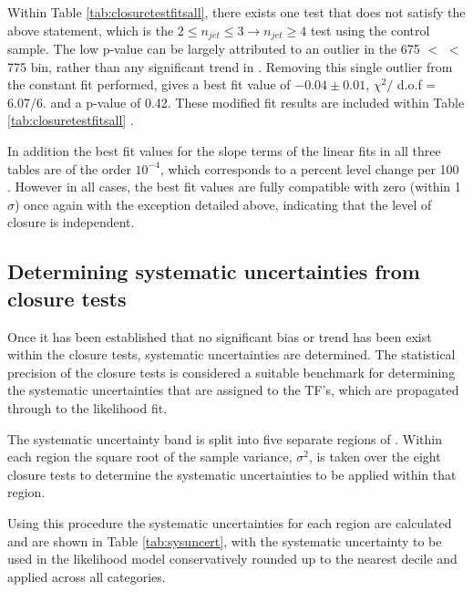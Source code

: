 Within Table \ref{tab:closuretestfitsall}, there exists one test that does not satisfy the above statement, which is the $2 \leq n_{jet} \leq 3 \rightarrow n_{jet} \geq 4$ test using the \mupjets control sample. The low p-value can be largely attributed to an outlier in the 675 $<$ \theht $<$ 775 \GeV bin, rather than any significant trend in \theht. Removing this single outlier from the constant fit performed, gives a best fit value of $-0.04 \pm 0.01$, $\chi^{2} /$ d.o.f = 6.07/6. and a p-value of 0.42. These modified fit results are included within Table \ref{tab:closuretestfitsall} .

In addition the best fit values for the slope terms of the linear fits in all three tables are of the order $10^{-4}$, which corresponds to a percent level change per 100 \GeV. However in all cases, the best fit values are fully compatible with zero (within 1$\sigma$) once again with the exception detailed above, indicating that the level of closure is \theht independent.

\subsection{Determining systematic uncertainties from closure tests}
\label{subsec:determinesystematics}

Once it has been established that no significant bias or trend has been exist within the closure tests, systematic uncertainties are determined. The statistical precision of the closure tests is considered a suitable benchmark for determining the systematic uncertainties that are assigned to the \ac{TF}'s, which are propagated through to the likelihood fit.

The systematic uncertainty band is split into five separate regions of \theht. Within each region the square root of the sample variance, $\sigma^{2}$, is taken over the eight closure tests to determine the systematic uncertainties to be applied within that region.

Using this procedure the systematic uncertainties for each region are calculated and are shown in Table \ref{tab:sysuncert}, with the systematic uncertainty to be used in the likelihood model conservatively rounded up to the nearest decile and applied across all \nbreco categories.

